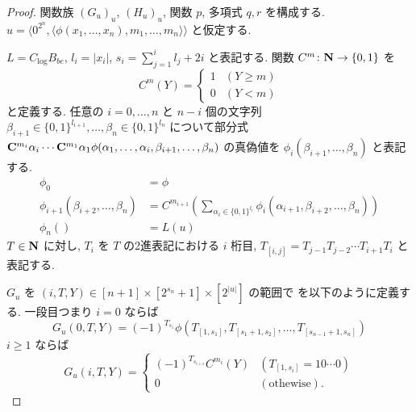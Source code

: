 \begin{proof}
 関数族 $(G_u)_u$, $(H_u)_u$, 関数 $p$, 多項式 $q,r$ を構成する.
 $u  = \langle 0^{2^n}, 
 \langle \phi(x_1, \dots, x_n), m_1, \dots, m_n \rangle \rangle$
 と仮定する.
 
 $L = C_{\log} B_{be}$,
 $l_i = |x_i|$,
 $s_i = \sum^i_{j=1}l_j + 2i$  と表記する.
 関数 $C^m \colon \mathbf N \to \{0,1\}$ を
 \begin{equation}
  C^m(Y) 
     = \begin{cases}
       1 & (Y \ge m) \\
       0 & (Y < m) \end{cases}
 \end{equation}
 と定義する. 
 任意の $i = 0, \dots, n$ と $n-i$ 個の文字列 
 $\beta_{i+1} \in \{0,1\}^{l_{i+1}}, \dots, \beta_n \in \{0,1\}^{l_n}$ 
 について部分式
 $\mathbf{C}^{m_{i}}{\alpha_i} \cdots \mathbf{C}^{m_1}{\alpha_1}
 \phi(\alpha_1, \dots, \alpha_i, \beta_{i+1}, \dots, \beta_n)$
 の真偽値を $\phi_i(\beta_{i+1}, \dots, \beta_n)$ と表記する.
 \begin{align}
  \phi_0 &= \phi 
  \\ \label{eq:phi-step}
  \phi_{i+1}(\beta_{i+2}, \dots, \beta_n) 
  &= C^{m_{i+1}}\left(\sum\nolimits_{\alpha_i \in \{0,1\}^{l_i}} 
  \phi_i(\alpha_{i+1}, \beta_{i+2}, \dots, \beta_{n})\right) 
  \\
  \phi_n() &= L(u) 
 \end{align}
 $T \in \mathbf N$ に対し, $T_i$ を $T$ の2進表記における $i$ 桁目, 
 $T_{[i,j]} = T_{j-1} T_{j-2} \cdots T_{i+1} T_{i}$ と表記する.


 $G_u$ を $(i, T, Y) \in [n+1] \times [2^{s_n}+1] \times [2^{|u|}]$ の範囲で
 を以下のように定義する. 一段目つまり $i=0$ ならば
 \begin{equation}
  G_u(0,T,Y) = 
   (-1)^{T_{s_1}}\phi(T_{[1,s_1]}, T_{[s_1+1,s_2]},
    \dots, T_{[s_{n-1}+1,s_n]}) 
 \end{equation}
 $i \ge 1$ ならば
 \begin{equation} \label{eq:def-Gu:case0}
  G_u(i,T,Y) = 
   \begin{cases}
    (-1)^{T_{s_{i+1}}} C^{m_i}(Y) 
    & (T_{[1,s_i]} = 10 \cdots 0) \\
    0 & (\text{othewise}).
   \end{cases} 
 \end{equation}



\end{proof}
